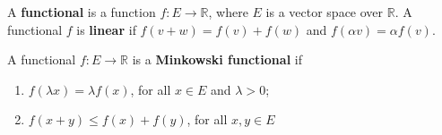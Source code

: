\begin{defn} A \textbf{functional} is a function $f:E\rightarrow \mathbb{R}$, where $E$ is a vector space over $\mathbb{R}$. A functional $f$ is \textbf{linear} if $f(v+w)=f(v)+f(w)$ and $f(\alpha v)=\alpha f(v)$.
\end{defn}

\begin{defn} A functional $f:E\rightarrow \mathbb{R}$ is a \textbf{Minkowski functional} if 
\begin{enumerate}
\item $f(\lambda x)=\lambda f(x)$, for all $x\in E$ and $\lambda>0$;
\item $f(x+y)\leq f(x)+f(y)$, for all $x,y\in E$
\end{enumerate}
\end{defn}

